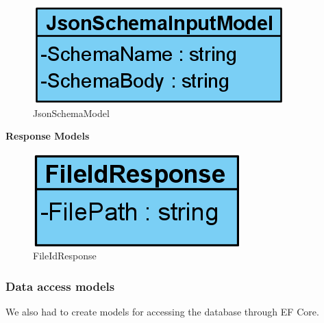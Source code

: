 
\begin{figure}[H]
    \centering
    \includegraphics[scale=0.25]{Images/JsonSchemaInputModel.png}
    \caption{JsonSchemaModel}
    \label{JsonSchemaModel}
\end{figure}

\textbf{Response Models}\\

\begin{figure}[H]
    \centering
    \includegraphics[scale=0.25]{Images/FileIdResponse.png}
    \caption{FileIdResponse}
    \label{FileIdResponse}
\end{figure}

\subsubsection*{Data access models}
We also had to create models for accessing the database through EF Core.


